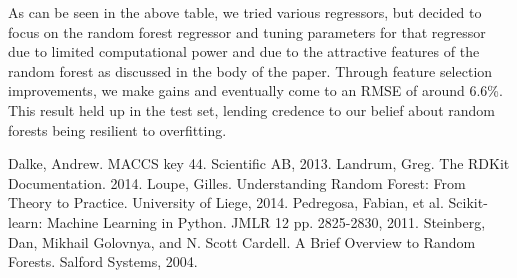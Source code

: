 \documentclass[11pt]{article}
\begin{document}
As can be seen in the above table, we tried various regressors, but decided to focus on the random forest regressor and tuning parameters for that regressor due to limited computational power and due to the attractive features of the random forest as discussed in the body of the paper. Through feature selection improvements, we make gains and eventually come to an RMSE of around 6.6\%. This result held up in the test set, lending credence to our belief about random forests being resilient to overfitting. 

\begin{thebibliography}{}
 Dalke, Andrew. MACCS key 44. Scientific AB, 2013. 
 Landrum, Greg. The RDKit Documentation. 2014. 
 Loupe, Gilles. Understanding Random Forest: From Theory to Practice. University of Liege, 2014. 
 Pedregosa, Fabian, et al. Scikit-learn: Machine Learning in Python. JMLR 12 pp. 2825-2830, 2011. 
 Steinberg, Dan, Mikhail Golovnya, and N. Scott Cardell. A Brief Overview to Random Forests. Salford Systems, 2004. 
\end{thebibliography}
\end{document}
